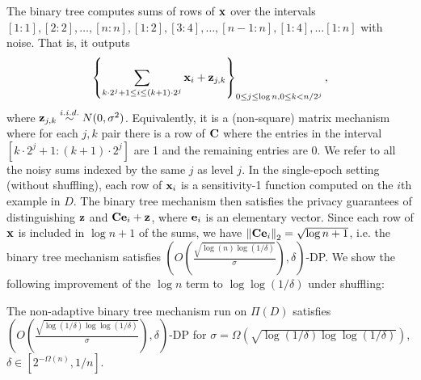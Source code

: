 The binary tree computes sums of rows of $\mathbf{x}$ over the intervals $[1:1], [2:2], \ldots, [n:n], [1:2], [3:4], \ldots, [n-1:n], [1:4], \ldots [1:n]$ with noise. That is, it outputs 
%
\[\left\{\sum_{k \cdot 2^j + 1 \leq i \leq (k+1) \cdot 2^j} \mathbf{x}_i + \mathbf{z}_{j,k}\right\}_{0 \leq j \leq \log n, 0 \leq k < n/2^j},\]
%
where $\mathbf{z}_{j,k} \stackrel{i.i.d.}{\sim} N(0, \sigma^2)$. Equivalently, it is a (non-square) matrix mechanism where for each $j, k$ pair there is a row of $\mathbf{C}$ where the entries in the interval $[k \cdot 2^j + 1 : (k+1) \cdot 2^j]$ are 1 and the remaining entries are 0. We refer to all the noisy sums indexed by the same $j$ as level $j$. In the single-epoch setting (without shuffling), each row of $\mathbf{x}_i$ is a sensitivity-1 function computed on the $i$th example in $D$. The binary tree mechanism then satisfies the privacy guarantees of distinguishing $\mathbf{z}$ and $\mathbf{C} \mathbf{e}_i + \mathbf{z}$, where $\mathbf{e}_i$ is an elementary vector. Since each row of $\mathbf{x}$ is included in $\log n + 1$ of the sums, we have $\left\|\mathbf{C} \mathbf{e}_i\right\|_2 = \sqrt{\log n + 1}$, i.e. the binary tree mechanism satisfies $\left(O\left(\frac{\sqrt{\log(n) \log(1/\delta)}}{\sigma}\right), \delta\right)$-DP. We show the following improvement of the $\log n$ term to $\log \log (1/\delta)$ under shuffling:
\begin{theorem}\label{thm:ftrl-shuffle}
The non-adaptive binary tree mechanism run on $\Pi(D)$ satisfies $\left(O\left(\frac{\sqrt{\log(1/\delta) \log \log(1/\delta)}}{\sigma}\right), \delta\right)$-DP for $\sigma = \Omega(\sqrt{\log (1/\delta) \log \log (1/\delta)})$, $\delta \in [2^{-\Omega(n)}, 1/n]$. 
\end{theorem}



